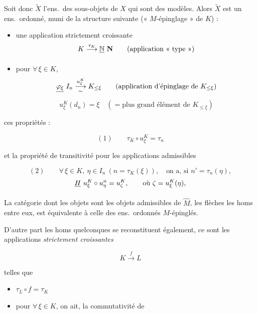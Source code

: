 \documentclass[11pt,a4paper]{article}
\begin{document}
Soit donc $\widetilde{X}$ l'ens.\ des \struck{\ill{}} sous-objets de $X$ qui
sont des modèles. Alors $\widetilde{X}$  est un ens.\ ordonné, muni
de la structure suivante (« $M$-épinglage » de $K$) :

\begin{itemize}
\item[a)] \struck{\ill{}} une application strictement croissante
\[
K \overset{\tau_K}{\longrightarrow} \struck{\mathbb{N}}\ \mathbf{N}
\qquad (\text{application « type »})
\]
\item[b)] pour $\forall\, \xi \in K$, 
 \struck{\ill{}}
\[
\struck{\varphi_\xi}\ I_n \overset{u_\xi^K}{\underset{\sim}{\longrightarrow}} K_{\leq \xi}
\qquad (\text{application d'épinglage de } K_{\leq \xi})
\]
\[
u_\xi^K(d_n) = \xi \quad (= \text{plus grand élément de } K_{\leq \xi})
\]
\end{itemize}

ces  propriétés \struck{\ill{}} :



\[
(1) \qquad \tau_K \circ u_\xi^K = \tau_n
\]

et la propriété de transitivité pour les applications admissibles

\[
(2) \qquad \forall\, \xi \in K,\ \eta \in I_n \ (n = \tau_K(\xi)),
\quad \text{on a, si } n' = \tau_n(\eta),
\]
\[
\struck{H}\ u_\xi^K \circ u_\eta^n = u_\zeta^K,
\qquad \text{où } \zeta = u_\xi^K(\eta),
\]

 

La catégorie dont les objets sont les objets admissibles de $\widehat{M}$, les
flèches les homs entre eux, est équivalente à celle des
ens.\ ordonnés $M$-épinglés.

D'autre part les homs quelconques 
se reconstituent également, ce sont les applications
\emph{strictement croissantes}

\[
K \overset{f}{\longrightarrow} L
\]

telles que

\begin{itemize}
\item[a)] $\tau_L \circ f = \tau_K$
\item[b)] pour $\forall\, \xi \in K$, on ait, 
la commutativité de
\end{itemize}
\end{document}
